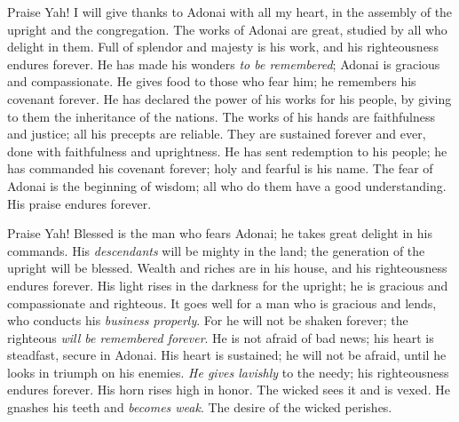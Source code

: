 \begin{biblechapter} %
 Praise Yah! 
I will give thanks to Adonai with all my heart, 
in the assembly of the upright and the congregation.
\verse The works of Adonai are great, 
studied by all who delight in them.
\verse Full of splendor and majesty is his work, 
and his righteousness endures forever.
\verse He has made his wonders \textit{to be remembered}; 
Adonai is gracious and compassionate.
\verse He gives food to those who fear him; 
he remembers his covenant forever.
\verse He has declared the power of his works for his people, 
by giving to them the inheritance of the nations.
\verse The works of his hands are faithfulness and justice; 
all his precepts are reliable.
\verse They are sustained forever and ever, 
done with faithfulness and uprightness.
\verse He has sent redemption to his people; 
he has commanded his covenant forever; 
holy and fearful is his name.
\verse The fear of Adonai is the beginning of wisdom; 
all who do them have a good understanding. 
His praise endures forever.
\end{biblechapter}

\begin{biblechapter} %
 Praise Yah! 
Blessed is the man who fears Adonai; 
he takes great delight in his commands.
\verse His \textit{descendants} will be mighty in the land; 
the generation of the upright will be blessed.
\verse Wealth and riches are in his house, 
and his righteousness endures forever.
\verse His light rises in the darkness for the upright; 
he is gracious and compassionate and righteous.
\verse It goes well for a man who is gracious and lends, 
who conducts his \textit{business properly}.
\verse For he will not be shaken forever; 
the righteous \textit{will be remembered forever}.
\verse He is not afraid of bad news; 
his heart is steadfast, secure in Adonai.
\verse His heart is sustained; he will not be afraid, 
until he looks in triumph on his enemies.
\verse \textit{He gives lavishly} to the needy; 
his righteousness endures forever. 
His horn rises high in honor.
\verse The wicked sees it and is vexed. 
He gnashes his teeth and \textit{becomes weak}. 
The desire of the wicked perishes.
\end{biblechapter}

